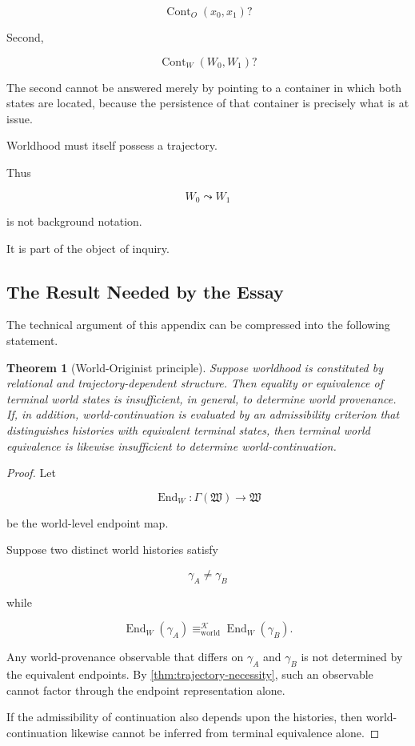 \documentclass[
  11pt,
  a4paper,
  DIV=12,
  BCOR=0mm,
  parskip=half-
]{scrartcl}
\newcommand{\eqworld}{%
  \equiv_{\mathrm{world}}%
}
\newcommand{\End}{\operatorname{End}}
\newcommand{\Cont}{\operatorname{Cont}}
\theoremstyle{definition}
\theoremstyle{plain}
\newtheorem{theorem}[definition]{Theorem}
\theoremstyle{remark}
\begin{document}
\[
  \Cont_O(x_0,x_1)?
\]

Second,

\[
  \Cont_W(W_0,W_1)?
\]

The second cannot be answered merely by pointing to a container in which both
states are located, because the persistence of that container is precisely
what is at issue.

Worldhood must itself possess a trajectory.

Thus

\[
  W_0
  \leadsto
  W_1
\]

is not background notation.

It is part of the object of inquiry.


\subsection{The Result Needed by the Essay}
\label{app:world-originist-principle}

The technical argument of this appendix can be compressed into the following
statement.

\begin{theorem}[World-Originist principle]
\label{thm:world-originist}
Suppose worldhood is constituted by relational and trajectory-dependent
structure. Then equality or equivalence of terminal world states is
insufficient, in general, to determine world provenance. If, in addition,
world-continuation is evaluated by an admissibility criterion that
distinguishes histories with equivalent terminal states, then terminal
world equivalence is likewise insufficient to determine world-continuation.
\end{theorem}

\begin{proof}
Let

\[
  \End_W:
  \Gamma(\mathfrak W)
  \to
  \mathfrak W
\]

be the world-level endpoint map.

Suppose two distinct world histories satisfy

\[
  \gamma_A\neq\gamma_B
\]

while

\[
  \End_W(\gamma_A)
  \eqworld^{\mathcal K}
  \End_W(\gamma_B).
\]

Any world-provenance observable that differs on \(\gamma_A\) and \(\gamma_B\)
is not determined by the equivalent endpoints. By
\cref{thm:trajectory-necessity}, such an observable cannot factor through the
endpoint representation alone.

If the admissibility of continuation also depends upon the histories, then
world-continuation likewise cannot be inferred from terminal equivalence
alone.
\end{proof}
\end{document}

